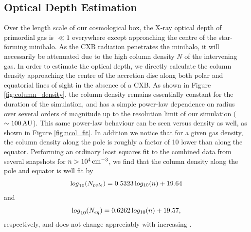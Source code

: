 \documentclass[../thesis.tex]{subfiles}
\begin{document}
\subsection{Optical Depth Estimation}
\label{attenuation}
Over the length scale of our cosmological box, the X-ray optical depth of primordial gas is $\ll 1$ everywhere except approaching the centre of the star-forming minihalo. As the CXB radiation penetrates the minihalo, it will necessarily be attenuated due to the high column density $N$ of the intervening gas.  In order to estimate the optical depth, we directly calculate the column density approaching the centre of the accretion disc along both polar and equatorial lines of sight in the absence of a CXB. As shown in Figure \ref{fig:column_density}, the column density remains essentially constant for the duration of the simulation, and has a simple power-law dependence on radius over several orders of magnitude up to the resolution limit of our simulation ($\sim100\,\mathrm{AU}$). This same power-law behaviour can be seen versus density as well, as shown in Figure \ref{fig:ncol_fit}. In addition we notice that for a given gas density, the column density along the pole is roughly a factor of 10 lower than along the equator.  Performing an ordinary least squares fit to the combined data from several snapshots for $n > 10^4\,\mathrm{cm}^{-3}$, we find that the column density along the pole and equator is well fit by 
\begin{equation}
{\mathrm log}_{10}(N_{\mathrm \small pole}) = 0.5323\, {\mathrm log_{10}}(n) + 19.64
\end{equation}
and
\begin{equation}
{\mathrm log}_{10}(N_{\mathrm \small eq}) = 0.6262\, {\mathrm log_{10}}(n) + 19.57, 
\end{equation}
respectively, and does not change appreciably with increasing \jxr.
\end{document}
